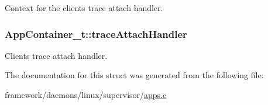 Context for the client\textquotesingle{}s trace attach handler. 

\subsubsection[{\texorpdfstring{trace\+Attach\+Handler}{traceAttachHandler}}]{ App\+Container\+\_\+t\+::trace\+Attach\+Handler}\hypertarget{struct_app_container__t_aac07518a319eb3394c8a9164d2f7a025}{}\label{struct_app_container__t_aac07518a319eb3394c8a9164d2f7a025}


Client\textquotesingle{}s trace attach handler. 



The documentation for this struct was generated from the following file\+:\begin{DoxyCompactItemize}
\item 
framework/daemons/linux/supervisor/\hyperlink{apps_8c}{apps.\+c}\end{DoxyCompactItemize}
